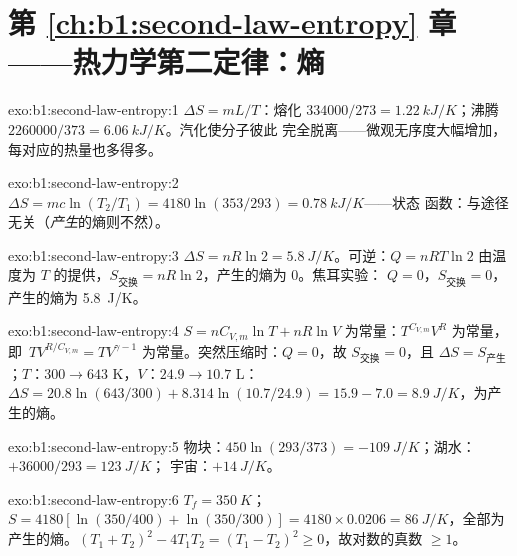 \section*{第 \ref{ch:b1:second-law-entropy} 章——热力学第二定律：熵}

\begin{solution}{exo:b1:second-law-entropy:1}
$\Delta S = mL/T$：熔化 $334000/273 = \qty{1.22}{kJ/K}$；沸腾 $2260000/
373 = \qty{6.06}{kJ/K}$。汽化使分子彼此
完全脱离——微观无序度大幅增加，
每对应的热量也多得多。
\end{solution}

\begin{solution}{exo:b1:second-law-entropy:2}
$\Delta S = mc\ln(T_2/T_1) = 4180\ln(353/293) = \qty{0.78}{kJ/K}$——状态
函数：与途径无关（\emph{产生}的熵则不然）。
\end{solution}

\begin{solution}{exo:b1:second-law-entropy:3}
$\Delta S = nR\ln2 = \qty{5.8}{J/K}$。可逆：$Q = nRT\ln2$
由温度为 $T$ 的提供，$S_{\text{交换}} = nR\ln2$，产生的熵为 $0$。焦耳实验：
$Q = 0$，$S_{\text{交换}} = 0$，产生的熵为 \qty{5.8}{J/K}。
\end{solution}

\begin{solution}{exo:b1:second-law-entropy:4}
$S = nC_{V,m}\ln T + nR\ln V$ 为常量：$T^{C_{V,m}}V^R$ 为常量，即\
$TV^{R/C_{V,m}} = TV^{\gamma - 1}$ 为常量。突然压缩时：$Q = 0$，故
$S_{\text{交换}} = 0$，且 $\Delta S = S_{\text{产生}}$；$T$：$300 \to
643$ K，$V$：$24.9 \to 10.7$ L：$\Delta S = 20.8\ln(643/300) + 8.314\ln(10.7/
24.9) = 15.9 - 7.0 = \qty{+8.9}{J/K}$，为产生的熵。
\end{solution}

\begin{solution}{exo:b1:second-law-entropy:5}
物块：$450\ln(293/373) = \qty{-109}{J/K}$；湖水：$+36000/293 = \qty{+123}{J/K}$；
宇宙：$+\qty{14}{J/K}$。
\end{solution}

\begin{solution}{exo:b1:second-law-entropy:6}
$T_f = \qty{350}{K}$；$S = 4180[\ln(350/400) + \ln(350/300)] = 4180 \times
0.0206 = \qty{86}{J/K}$，全部为产生的熵。$(T_1 + T_2)^2 - 4T_1T_2 = (T_1 - T_2)^2
\geq 0$，故对数的真数 $\geq 1$。
\end{solution}

